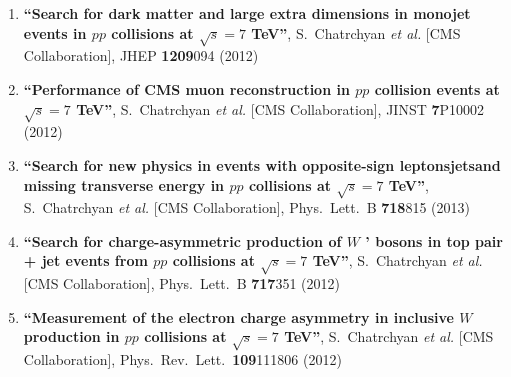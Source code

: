 \begin{enumerate}
\item%
{\bf ``Search for dark matter and large extra dimensions in monojet events in $pp$ collisions at $\sqrt{s}=7$ TeV''}, 
  S.~Chatrchyan {\it et al.}  [CMS Collaboration], 
JHEP {\bf 1209}094 (2012) %


\item%
{\bf ``Performance of CMS muon reconstruction in $pp$ collision events at $\sqrt{s}=7$ TeV''}, 
  S.~Chatrchyan {\it et al.}  [CMS Collaboration], 
JINST {\bf 7}P10002 (2012) %


\item%
{\bf ``Search for new physics in events with opposite-sign leptonsjetsand missing transverse energy in $pp$ collisions at $\sqrt{s}=7$ TeV''}, 
  S.~Chatrchyan {\it et al.}  [CMS Collaboration], 
Phys.\ Lett.\ B {\bf 718}815 (2013) %


\item%
{\bf ``Search for charge-asymmetric production of $W$ ' bosons in top pair + jet events from $pp$ collisions at $\sqrt{s}=7$ TeV''}, 
  S.~Chatrchyan {\it et al.}  [CMS Collaboration], 
Phys.\ Lett.\ B {\bf 717}351 (2012) %


\item%
{\bf ``Measurement of the electron charge asymmetry in inclusive $W$ production in $pp$ collisions at $\sqrt{s}=7$ TeV''}, 
  S.~Chatrchyan {\it et al.}  [CMS Collaboration], 
Phys.\ Rev.\ Lett.\  {\bf 109}111806 (2012) %



\end{enumerate}
